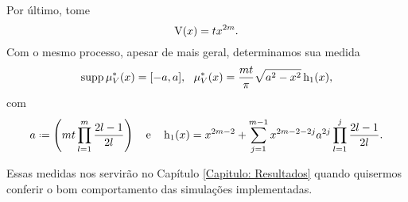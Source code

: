  
 Por último, tome $$\operatorname{V}(x) = t x^{2m}.$$ Com o mesmo processo, apesar de mais geral, determinamos sua medida 
 \begin{equation}
 	\operatorname{supp} \mu^*_V(x) = [-a, a], \ \ \mu^*_V(x) = \frac{mt}{\pi} \sqrt{a^2 - x^2} \operatorname{h_1}(x),
 	\label{Equação: Mônico}
 \end{equation}
com $$ a \deff \left( mt \prod_{l=1}^{m} \frac{2l-1}{2l}\right) \ \ \ \text{e} \ \ \ \h(x) = x^{2m-2} + \sum_{j=1}^{m-1} x^{2m-2-2j} a^{2j} \prod_{l=1}^{j} \frac{2l-1}{2l}.$$

Essas medidas nos servirão no Capítulo \ref{Capitulo: Resultados} quando quisermos conferir o bom comportamento das simulações implementadas.
